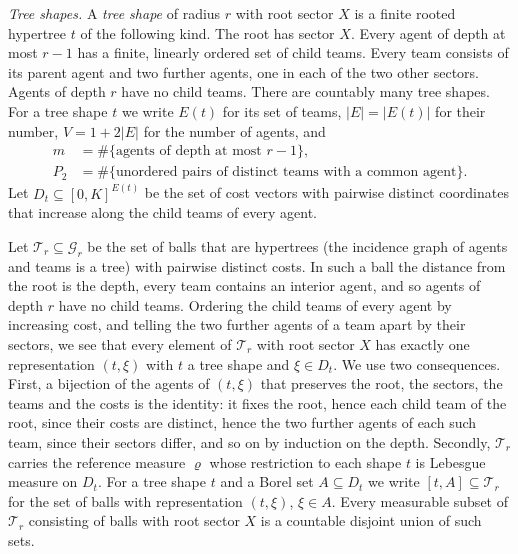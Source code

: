 \emph{Tree shapes.} A \emph{tree shape} of radius $r$ with root sector $X$ is a finite
rooted hypertree $t$ of the following kind. The root has sector $X$. Every agent of depth at
most $r-1$ has a finite, linearly ordered set of child teams. Every team consists of its
parent agent and two further agents, one in each of the two other sectors. Agents of depth
$r$ have no child teams. There are countably many tree shapes. For a tree shape $t$ we write
$E(t)$ for its set of teams, $|E|=|E(t)|$ for their number, $V=1+2|E|$ for the number of
agents, and
\begin{align*}
m&=\#\{\text{agents of depth at most } r-1\},\\
P_2&=\#\{\text{unordered pairs of distinct teams with a common agent}\}.
\end{align*} Let $D_t\subseteq[0,K]^{E(t)}$ be the set of cost vectors
with pairwise distinct coordinates that increase along the child teams of every agent.

Let $\mathcal T_r\subseteq\mathcal G_r$ be the set of balls that are hypertrees (the
incidence graph of agents and teams is a tree) with pairwise distinct costs. In such a ball
the distance from the root is the depth, every team contains an interior agent, and so
agents of depth $r$ have no child teams. Ordering the child teams of every agent by
increasing cost, and telling the two further agents of a team apart by their sectors, we see
that every element of $\mathcal T_r$ with root sector $X$ has exactly one representation
$(t,\xi)$ with $t$ a tree shape and $\xi\in D_t$. We use two consequences. First, a
bijection of the agents of $(t,\xi)$ that preserves the root, the sectors, the teams and the
costs is the identity: it fixes the root, hence each child team of the root, since their
costs are distinct, hence the two further agents of each such team, since their sectors
differ, and so on by induction on the depth. Secondly, $\mathcal T_r$ carries the reference
measure $\varrho$ whose restriction to each shape $t$ is Lebesgue measure on $D_t$. For a
tree shape $t$ and a Borel set $A\subseteq D_t$ we write $[t,A]\subseteq\mathcal T_r$ for the
set of balls with representation $(t,\xi)$, $\xi\in A$. Every measurable subset of
$\mathcal T_r$ consisting of balls with root sector $X$ is a countable disjoint union of
such sets.

